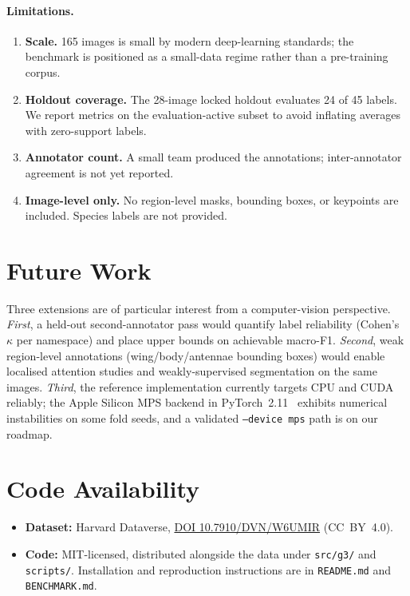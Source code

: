 \documentclass[11pt,a4paper]{article}
\begin{document}
\paragraph{Limitations.}
\begin{enumerate}
  \item \textbf{Scale.} 165 images is small by modern deep-learning
        standards; the benchmark is positioned as a small-data
        regime rather than a pre-training corpus.
  \item \textbf{Holdout coverage.} The 28-image locked holdout
        evaluates 24 of 45 labels. We report metrics on the
        evaluation-active subset to avoid inflating averages with
        zero-support labels.
  \item \textbf{Annotator count.} A small team produced the
        annotations; inter-annotator agreement is not yet reported.
  \item \textbf{Image-level only.} No region-level masks, bounding
        boxes, or keypoints are included. Species labels are not
        provided.
\end{enumerate}

\section{Future Work}
Three extensions are of particular interest from a computer-vision
perspective. \emph{First}, a held-out second-annotator pass would
quantify label reliability (Cohen's $\kappa$ per namespace) and
place upper bounds on achievable macro-F1. \emph{Second}, weak
region-level annotations (wing/body/antennae bounding boxes) would
enable localised attention studies and weakly-supervised
segmentation on the same images. \emph{Third}, the reference
implementation currently targets CPU and CUDA reliably; the Apple
Silicon MPS backend in PyTorch~2.11~\citep{paszke2019pytorch}
exhibits numerical
instabilities on some fold seeds, and a validated
\texttt{--device mps} path is on our roadmap.

\section{Code Availability}
\begin{itemize}
  \item \textbf{Dataset:} Harvard Dataverse,
        \href{https://doi.org/10.7910/DVN/W6UMIR}{DOI 10.7910/DVN/W6UMIR}
        (CC~BY~4.0).
  \item \textbf{Code:} MIT-licensed, distributed alongside the
        data under \texttt{src/g3/} and \texttt{scripts/}.
        Installation and reproduction instructions are in
        \texttt{README.md} and \texttt{BENCHMARK.md}.
\end{itemize}
\end{document}
